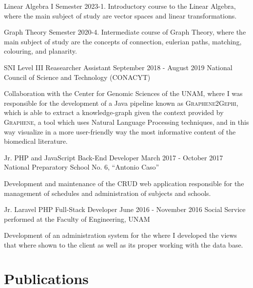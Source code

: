 \documentclass{curriculum-vitae}
\begin{document}
        \course%
            {Linear Algebra I}
            {Semester 2023-1.}
            {Introductory course to the Linear Algebra, where the main subject
              of study are vector spaces and linear transformations.}

        \course%
            {Graph Theory}
            {Semester 2020-4.}
            {Intermediate course of Graph Theory, where the main subject of
              study are the concepts of connection, eulerian paths, matching,
              colouring, and planarity.}

    \experiencesubsection%
      {SNI Level III Reasearcher Assistant}
      {September 2018 - August 2019}
      {National Council of Science and Technology (CONACYT)}

      Collaboration with the Center for Genomic Sciences of the UNAM, where I
      was responsible for the development of a Java pipeline known as
      \textsc{Graphene2Gephi}, which is able to extract a knowledge-graph given
      the context provided by \textsc{Graphene}, a tool which uses Natural
      Language Processing techniques, and in this way visualize in a more
      user-friendly way the most informative content of the biomedical
      literature.

    \experiencesubsection%
      {Jr. PHP and JavaScript Back-End Developer}
      {March 2017 - October 2017}
      {National Preparatory School No. 6, ``Antonio Caso''}

      Development and maintenance of the CRUD web application responsible for
      the management of schedules and administration of subjects and schools.

    \experiencesubsection%
      {Jr. Laravel PHP Full-Stack Developer}
      {June 2016 - November 2016}
      {Social Service performed at the Faculty of Engineering, UNAM}

      Development of an administration system for the  where I developed the views that where shown to
      the client as well as its proper working with the data base.

  \section{Publications}

    \subsection{}
\end{document}
